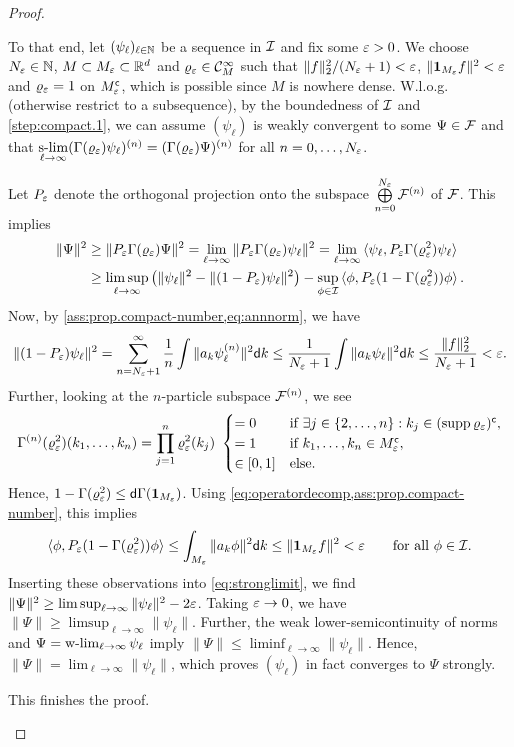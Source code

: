 \documentclass[a4paper,12pt,oneside]{article}
\newcommand{\chr}[1]{\mathbf{1}_{#1}}
\begin{document}
\begin{proof}
\begin{step}
		To that end, let $(\psi_\ell)_{\ell\in{\mathbb N}}$ be a sequence in ${\mathcal I}$ and fix some  $\varepsilon>0$. We choose $N_\varepsilon\in{\mathbb N}$, $M\subset M_\varepsilon\subset {\mathbb R}^d$ and $\varrho_\varepsilon \in {\mathcal C}^\infty_M$ such  that $\|f\|_2^2/(N_\varepsilon+1)<\varepsilon$, $\|\chr{M_\eps} f\|^2<\eps$ and $\varrho_\varepsilon = 1$ on $M_\varepsilon^{\mathsf c}$, which is possible since $M$ is nowhere dense. W.l.o.g. (otherwise restrict to a subsequence), by the boundedness of ${\mathcal I}$ and \cref{step:compact.1}, we can assume $(\psi_\ell)$ is weakly convergent to some $\Psi\in {\mathcal F}$ and that $\operatorname*{s-lim}\limits_{\ell\to\infty}(\Gamma(\varrho_\varepsilon)\psi_\ell)^{(n)} = (\Gamma(\varrho_\varepsilon)\Psi)^{(n)}$ for all $n=0,\ldots,N_\varepsilon$.
		
		Let $P_\varepsilon$ denote the orthogonal projection onto the subspace $\bigoplus\limits_{n=0}^{N_\varepsilon}{\mathcal F}^{(n)}$ of ${\mathcal F}$. This implies
		\begin{equation}\label{eq:stronglimit}
			\begin{aligned}
			\|\Psi\|^2  &\ge \|P_\varepsilon \Gamma( \varrho_\varepsilon ) \Psi\|^2 = \lim_{\ell\to \infty} \|P_\varepsilon \Gamma(\varrho_\varepsilon)\psi_\ell\|^2 = \lim_{\ell\to \infty} \braket{\psi_\ell,P_\varepsilon\Gamma(\varrho_\varepsilon^2)\psi_\ell}  \\& \ge  \limsup_{\ell\to \infty}\left(\|\psi_\ell\|^2-\|(1-P_\varepsilon)\psi_\ell\|^2 \right) - \sup_{\phi\in{\mathcal I}}\braket{\phi,P_\varepsilon(1-\Gamma(\varrho_\varepsilon^2))\phi}.
			\end{aligned}
		\end{equation}
		Now, by \cref{ass:prop.compact-number,eq:annnorm}, we have
		\[ \|(1-P_\varepsilon)\psi_\ell\|^2 = \sum_{n=N_\varepsilon+1}^\infty\frac{1}{n}\int \|a_k\psi_\ell^{(n)}\|^2{\mathsf d} k \le \frac{1}{N_\varepsilon+1}\int \|a_k\psi_\ell\|^2 {\mathsf d} k \le \frac{\|f\|^2_2}{N_\varepsilon+1} < \varepsilon. \]
		Further, looking at the $n$-particle subspace ${\mathcal F}^{(n)}$, we see
		\[ \Gamma^{(n)}(\varrho_\eps^2)(k_1,\ldots,k_n) = \prod_{j=1}^{n}\varrho_\eps^2(k_j) \ \begin{cases} = 0 & \mbox{if}\ \exists j\in\{2,\ldots,n\}:k_j\in(\supp \varrho_\eps)^\sfc, \\ = 1 &\mbox{if}\ k_1,\ldots,k_n\in M_\eps^\sfc,\\ \in[0,1]& \mbox{else}.\end{cases}  \]
		Hence, $1-\Gamma(\varrho_\eps^2) \le \dG(\chr{M_\eps})$. Using \cref{eq:operatordecomp,ass:prop.compact-number}, this implies
		\[  \braket{\phi,P_\eps(1-\Gamma(\varrho_\eps^2))\phi} \le \int_{M_\eps} \|a_k\phi\|^2 \d k \le \|\chr{M_\eps}f\|^2 < \eps \qquad\mbox{for all}\ \phi\in\cI.\]
		Inserting these observations into \cref{eq:stronglimit}, we find $\|\Psi\|^2 \ge \limsup_{\ell\to \infty} \|\psi_\ell\|^2 - 2 \varepsilon$. Taking $\varepsilon\to 0$, we have $\|\Psi\|\ge \limsup_{\ell \to \infty}\|\psi_\ell\|$. Further, the weak lower-semicontinuity of norms and $\Psi = \operatorname*{w-lim}_{\ell\to\infty}\psi_\ell$ imply $\|\Psi\|\le \liminf_{\ell\to\infty}\|\psi_\ell\|$. Hence, $\|\Psi\| = \lim_{\ell\to\infty}\|\psi_\ell\|$, which proves $(\psi_\ell)$ in fact converges to $\Psi$ strongly.
		
		This finishes the proof.
	\end{step}
\end{proof}
\end{document}
